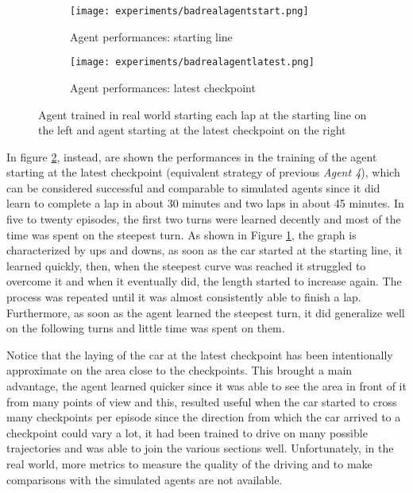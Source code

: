 \begin{figure}[h]
  \centering
  \begin{subfigure}{.5\linewidth}
      \centering
      \texttt{[image: experiments/badrealagentstart.png]}
      \caption{Agent performances: starting line}\label{fig:rlen}
  \end{subfigure}%
      \hfill
  \begin{subfigure}{.5\linewidth}
      \centering
      \texttt{[image: experiments/badrealagentlatest.png]}
      \caption{Agent performances: latest checkpoint}\label{fig:rrew}
  \end{subfigure}
  \caption{Agent trained in real world starting each lap at the starting line on the left and agent starting at the latest checkpoint on the right}
  \label{fig:realresult}
\end{figure}

In figure \ref{fig:rrew}, instead, are shown the performances in the training of the agent starting at the latest checkpoint (equivalent strategy of previous \textit{Agent 4}), which can be considered successful and comparable to simulated agents since it did learn to complete a lap in about 30 minutes and two laps in about 45 minutes. In five to twenty episodes, the first two turns were learned decently and most of the time was spent on the steepest turn. As shown in Figure \ref{fig:rlen}, the graph is characterized by ups and downs, as soon as the car started at the starting line, it learned quickly, then, when the steepest curve was reached it struggled to overcome it and when it eventually did, the length started to increase again. The process was repeated until it was almost consistently able to finish a lap. Furthermore, as soon as the agent learned the steepest turn, it did generalize well on the following turns and little time was spent on them.

Notice that the laying of the car at the latest checkpoint has been intentionally approximate on the area close to the checkpoints. This brought a main advantage, the agent learned quicker since it was able to see the area in front of it from many points of view and this, resulted useful when the car started to cross many checkpoints per episode since the direction from which the car arrived to a checkpoint could vary a lot, it had been trained to drive on many possible trajectories and was able to join the various sections well. Unfortunately, in the real world, more metrics to measure the quality of the driving and to make comparisons with the simulated agents are not available.

